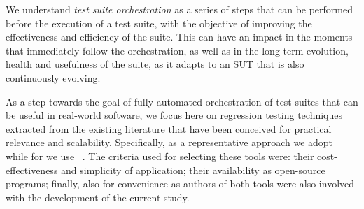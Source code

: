 

 

We understand \textit{test suite orchestration} as a series of steps that can be performed before the execution of a test suite, with the objective of improving the effectiveness and efficiency of the suite.
This can have an impact in the moments that immediately follow the orchestration, as well as in the long-term evolution, health and usefulness of the suite, as it adapts to an SUT that is also continuously evolving.

As a step towards the goal of fully automated orchestration of test suites that can be useful in real-world software, 
we focus here on regression testing techniques extracted from the existing literature that have been conceived for practical relevance and scalability.
Specifically, as a representative \tcs approach we adopt \ek~\cite{gligoricEk} while for \tcp we use \fs~\cite{miranda_fast}.
The criteria used for selecting these tools were: their cost-effectiveness and simplicity of application; their availability as open-source programs; finally, also for convenience as authors of both tools were also involved with the development of the current study.

